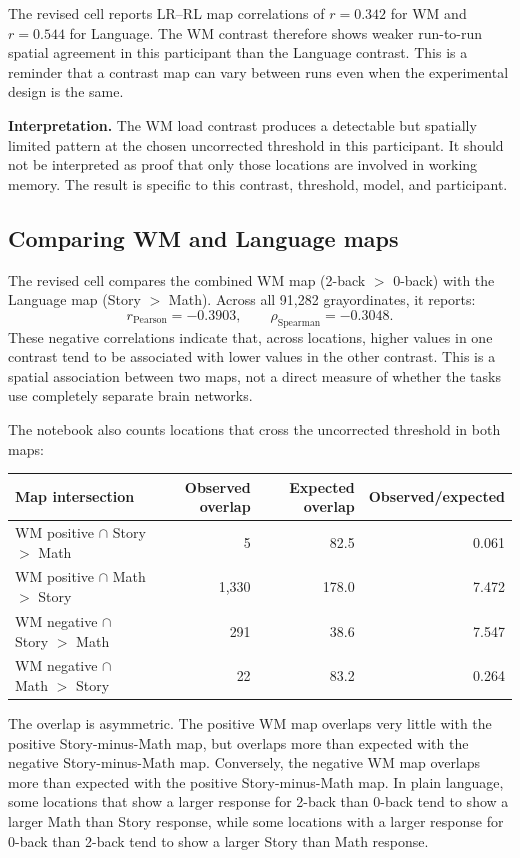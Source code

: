 \documentclass[11pt,a4paper]{article}
\begin{document}
The revised cell reports LR--RL map correlations of \(r=0.342\) for WM and \(r=0.544\) for Language. The WM contrast therefore shows weaker run-to-run spatial agreement in this participant than the Language contrast. This is a reminder that a contrast map can vary between runs even when the experimental design is the same.

\textbf{Interpretation.} The WM load contrast produces a detectable but spatially limited pattern at the chosen uncorrected threshold in this participant. It should not be interpreted as proof that only those locations are involved in working memory. The result is specific to this contrast, threshold, model, and participant.

\subsection{Comparing WM and Language maps}

The revised cell compares the combined WM map (2-back \(>\) 0-back) with the Language map (Story \(>\) Math). Across all 91,282 grayordinates, it reports:
\[
    r_{\mathrm{Pearson}}=-0.3903,\qquad
    \rho_{\mathrm{Spearman}}=-0.3048.
\]
These negative correlations indicate that, across locations, higher values in one contrast tend to be associated with lower values in the other contrast. This is a spatial association between two maps, not a direct measure of whether the tasks use completely separate brain networks.

The notebook also counts locations that cross the uncorrected threshold in both maps:

\begin{center}
\small
\setlength{\tabcolsep}{4pt}
\begin{tabular}{p{5cm}rrr}
\toprule
\textbf{Map intersection} &
\textbf{Observed overlap} &
\textbf{Expected overlap} &
\textbf{Observed/expected}\\
\midrule
WM positive $\cap$ Story $>$ Math & 5 & 82.5 & 0.061\\
WM positive $\cap$ Math $>$ Story & 1,330 & 178.0 & 7.472\\
WM negative $\cap$ Story $>$ Math & 291 & 38.6 & 7.547\\
WM negative $\cap$ Math $>$ Story & 22 & 83.2 & 0.264\\
\bottomrule
\end{tabular}
\end{center}

The overlap is asymmetric. The positive WM map overlaps very little with the positive Story-minus-Math map, but overlaps more than expected with the negative Story-minus-Math map. Conversely, the negative WM map overlaps more than expected with the positive Story-minus-Math map. In plain language, some locations that show a larger response for 2-back than 0-back tend to show a larger Math than Story response, while some locations with a larger response for 0-back than 2-back tend to show a larger Story than Math response.
\end{document}
